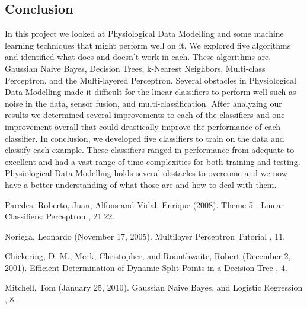 \documentclass[twoside]{article}
\begin{document}
\begin{multicols}{2}
\section{Conclusion}
In this project we looked at Physiological Data Modelling and some machine learning techniques that might perform well on it.  We explored five algorithms and identified what does and doesn't work in each.  These algorithms are, Gaussian Naive Bayes, Decision Trees, k-Nearest Neighbors, Multi-class Perceptron, and the Multi-layered Perceptron.  Several obstacles in Physiological Data Modelling made it difficult for the linear classifiers to perform well such as noise in the data, sensor fusion, and multi-classification. After analyzing our results we determined several improvements to each of the classifiers and one improvement overall that could drastically improve the performance of each classifier.  In conclusion, we developed five classifiers to train on the data and classify each example.  These classifiers ranged in performance from adequate to excellent and had a vast range of time complexities for both training and testing.  Physiological Data Modelling holds several obstacles to overcome and we now have a better understanding of what those are and how to deal with them.

\end{multicols}

\begin{thebibliography}{99}

Paredes, Roberto, Juan, Alfons  and Vidal, Enrique (2008).
\newblock Theme 5 : Linear Classifiers: Perceptron
, 21:22.

Noriega, Leonardo (November 17, 2005).
\newblock Multilayer Perceptron Tutorial
, 11. 

Chickering, D. M., Meek, Christopher, and Rounthwaite, Robert (December 2, 2001).
\newblock Efficient Determination of Dynamic Split Points in a Decision Tree
, 4.

Mitchell, Tom (January 25, 2010).
\newblock Gaussian Naive Bayes, and Logistic Regression
, 8. 

\end{thebibliography}
\end{document}
